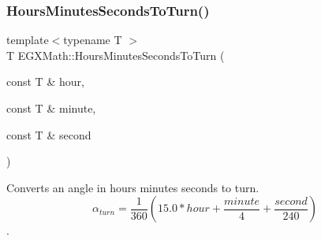 \mbox{\label{group___e_g_x_math-_angle_conversions-_hours_minutes_seconds_ga68050282994968cd6f80a396f6a539ae}} 
\subsubsection{\texorpdfstring{Hours\+Minutes\+Seconds\+To\+Turn()}{HoursMinutesSecondsToTurn()}}
{\footnotesize\ttfamily template$<$typename T $>$ \\
T E\+G\+X\+Math\+::\+Hours\+Minutes\+Seconds\+To\+Turn (\begin{DoxyParamCaption}\item[{const T \&}]{hour,  }\item[{const T \&}]{minute,  }\item[{const T \&}]{second }\end{DoxyParamCaption})}



Converts an angle in hours minutes seconds to turn. \[\alpha_{turn}=\frac{1}{360}(15.0 * hour + \frac{minute}{4} + \frac{second}{240})\]. 

